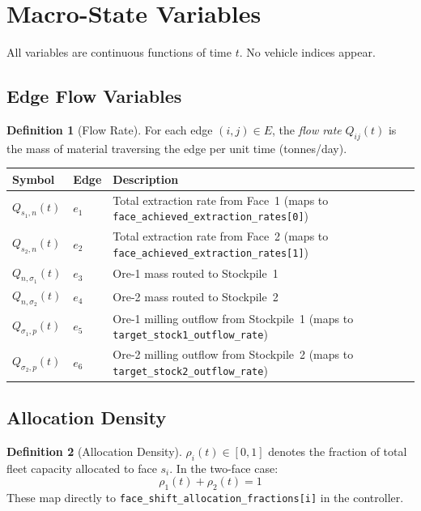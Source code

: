 \documentclass[11pt,a4paper]{article}
\theoremstyle{definition}
\newtheorem{definition}{Definition}[section]
\begin{document}
\section{Macro-State Variables}
\label{sec:variables}

All variables are continuous functions of time $t$.  No vehicle indices appear.

\subsection{Edge Flow Variables}

\begin{definition}[Flow Rate]
For each edge $(i,j) \in E$, the \emph{flow rate} $Q_{ij}(t)$ is the mass of
material traversing the edge per unit time (tonnes/day).
\end{definition}

\begin{center}
\begin{tabular}{@{}llp{8cm}@{}}
\toprule
\textbf{Symbol} & \textbf{Edge} & \textbf{Description} \\
\midrule
$Q_{s_1, n}(t)$ & $e_1$ & Total extraction rate from Face~1 (maps to \texttt{face\_achieved\_extraction\_rates[0]}) \\
$Q_{s_2, n}(t)$ & $e_2$ & Total extraction rate from Face~2 (maps to \texttt{face\_achieved\_extraction\_rates[1]}) \\
$Q_{n,\sigma_1}(t)$ & $e_3$ & Ore-1 mass routed to Stockpile~1 \\
$Q_{n,\sigma_2}(t)$ & $e_4$ & Ore-2 mass routed to Stockpile~2 \\
$Q_{\sigma_1,p}(t)$ & $e_5$ & Ore-1 milling outflow from Stockpile~1 (maps to \texttt{target\_stock1\_outflow\_rate}) \\
$Q_{\sigma_2,p}(t)$ & $e_6$ & Ore-2 milling outflow from Stockpile~2 (maps to \texttt{target\_stock2\_outflow\_rate}) \\
\bottomrule
\end{tabular}
\end{center}

\subsection{Allocation Density}

\begin{definition}[Allocation Density]
$\rho_i(t) \in [0,1]$ denotes the fraction of total fleet capacity allocated
to face $s_i$.  In the two-face case:
\begin{equation}
  \rho_1(t) + \rho_2(t) = 1
\end{equation}
These map directly to \texttt{face\_shift\_allocation\_fractions[i]} in the controller.
\end{definition}
\end{document}
